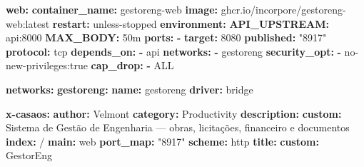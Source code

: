 \documentclass[
  10pt,
]{article}
\newenvironment{Shaded}{\begin{snugshade}}{\end{snugshade}}
\newcommand{\AttributeTok}[1]{\textcolor[rgb]{0.13,0.29,0.53}{#1}}
\newcommand{\DecValTok}[1]{\textcolor[rgb]{0.00,0.00,0.81}{#1}}
\newcommand{\FunctionTok}[1]{\textcolor[rgb]{0.13,0.29,0.53}{\textbf{#1}}}
\newcommand{\KeywordTok}[1]{\textcolor[rgb]{0.13,0.29,0.53}{\textbf{#1}}}
\newcommand{\StringTok}[1]{\textcolor[rgb]{0.31,0.60,0.02}{#1}}
\begin{document}
\begin{Shaded}
\begin{Highlighting}[]
\AttributeTok{  }\FunctionTok{web}\KeywordTok{:}
\AttributeTok{    }\FunctionTok{container\_name}\KeywordTok{:}\AttributeTok{ gestoreng{-}web}
\AttributeTok{    }\FunctionTok{image}\KeywordTok{:}\AttributeTok{ ghcr.io/incorpore/gestoreng{-}web:latest}
\AttributeTok{    }\FunctionTok{restart}\KeywordTok{:}\AttributeTok{ unless{-}stopped}
\AttributeTok{    }\FunctionTok{environment}\KeywordTok{:}
\AttributeTok{      }\FunctionTok{API\_UPSTREAM}\KeywordTok{:}\AttributeTok{ api:8000}
\AttributeTok{      }\FunctionTok{MAX\_BODY}\KeywordTok{:}\AttributeTok{ 50m}
\AttributeTok{    }\FunctionTok{ports}\KeywordTok{:}
\AttributeTok{      }\KeywordTok{{-}}\AttributeTok{ }\FunctionTok{target}\KeywordTok{:}\AttributeTok{ }\DecValTok{8080}
\AttributeTok{        }\FunctionTok{published}\KeywordTok{:}\AttributeTok{ }\StringTok{"8917"}
\AttributeTok{        }\FunctionTok{protocol}\KeywordTok{:}\AttributeTok{ tcp}
\AttributeTok{    }\FunctionTok{depends\_on}\KeywordTok{:}
\AttributeTok{      }\KeywordTok{{-}}\AttributeTok{ api}
\AttributeTok{    }\FunctionTok{networks}\KeywordTok{:}
\AttributeTok{      }\KeywordTok{{-}}\AttributeTok{ gestoreng}
\AttributeTok{    }\FunctionTok{security\_opt}\KeywordTok{:}
\AttributeTok{      }\KeywordTok{{-}}\AttributeTok{ no{-}new{-}privileges:true}
\AttributeTok{    }\FunctionTok{cap\_drop}\KeywordTok{:}
\AttributeTok{      }\KeywordTok{{-}}\AttributeTok{ ALL}

\FunctionTok{networks}\KeywordTok{:}
\AttributeTok{  }\FunctionTok{gestoreng}\KeywordTok{:}
\AttributeTok{    }\FunctionTok{name}\KeywordTok{:}\AttributeTok{ gestoreng}
\AttributeTok{    }\FunctionTok{driver}\KeywordTok{:}\AttributeTok{ bridge}

\FunctionTok{x{-}casaos}\KeywordTok{:}
\AttributeTok{  }\FunctionTok{author}\KeywordTok{:}\AttributeTok{ Velmont}
\AttributeTok{  }\FunctionTok{category}\KeywordTok{:}\AttributeTok{ Productivity}
\AttributeTok{  }\FunctionTok{description}\KeywordTok{:}
\AttributeTok{    }\FunctionTok{custom}\KeywordTok{:}\AttributeTok{ Sistema de Gestão de Engenharia — obras, licitações, financeiro e documentos}
\AttributeTok{  }\FunctionTok{index}\KeywordTok{:}\AttributeTok{ /}
\AttributeTok{  }\FunctionTok{main}\KeywordTok{:}\AttributeTok{ web}
\AttributeTok{  }\FunctionTok{port\_map}\KeywordTok{:}\AttributeTok{ }\StringTok{"8917"}
\AttributeTok{  }\FunctionTok{scheme}\KeywordTok{:}\AttributeTok{ http}
\AttributeTok{  }\FunctionTok{title}\KeywordTok{:}
\AttributeTok{    }\FunctionTok{custom}\KeywordTok{:}\AttributeTok{ GestorEng}
\end{Highlighting}
\end{Shaded}
\end{document}
